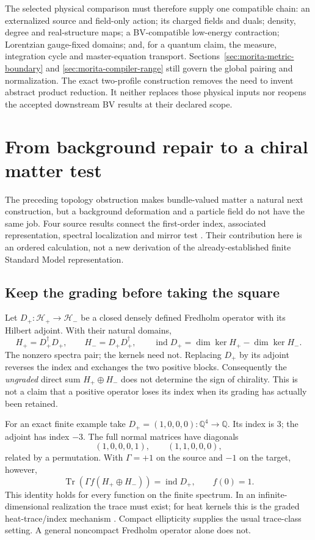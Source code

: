 \documentclass[11pt,a4paper]{article}
\begin{document}
The selected physical comparison must therefore supply one compatible
chain: an externalized source and field-only action; its charged fields
and duals; density, degree and real-structure maps; a BV-compatible
low-energy contraction; Lorentzian gauge-fixed domains; and, for a quantum
claim, the measure, integration cycle and master-equation transport.
Sections~\ref{sec:morita-metric-boundary} and
\ref{sec:morita-compiler-range} still govern the global pairing and
normalization. The exact two-profile construction removes the need to
invent abstract product reduction. It neither replaces those physical
inputs nor reopens the accepted downstream BV results at their declared
scope.

\section{From background repair to a chiral matter test}
\label{sec:matter-index-theta}

The preceding topology obstruction makes bundle-valued matter a natural
next construction, but a background deformation and a particle field do
not have the same job. Four source results connect the first-order index,
associated representation, spectral localization and mirror test
\cite{PreprojectionIndexFirst2026,PreprojectionMatterCompiler2026,
PreprojectionMatterTheta2026,PreprojectionBHTLocalization2026}.
Their contribution here is an ordered calculation, not a new derivation
of the already-established finite Standard Model representation.

\subsection{Keep the grading before taking the square}
\label{sec:matter-index-first}

Let \(D_+:\mathcal H_+\to\mathcal H_-\) be a closed densely defined
Fredholm operator with its Hilbert adjoint. With their natural domains,
\[
 H_+=D_+^\dagger D_+,\qquad H_-=D_+D_+^\dagger,\qquad
 \operatorname{ind}D_+=\dim\ker H_+-\dim\ker H_- .
\]
The nonzero spectra pair; the kernels need not. Replacing \(D_+\) by its
adjoint reverses the index and exchanges the two positive blocks.
Consequently the \emph{ungraded} direct sum \(H_+\oplus H_-\) does not
determine the sign of chirality. This is not a claim that a positive
operator loses its index when its grading has actually been retained.

For an exact finite example take \(D_+=(1,0,0,0):\mathbb Q^4\to\mathbb Q\).
Its index is \(3\); the adjoint has index \(-3\). The full normal matrices
have diagonals
\[
 (1,0,0,0,1),\qquad (1,1,0,0,0),
\]
related by a permutation. With \(\Gamma=+1\) on the source and \(-1\)
on the target, however,
\[
 \operatorname{Tr}\!\left(\Gamma f(H_+\oplus H_-)\right)
 =\operatorname{ind}D_+,\qquad f(0)=1.
\]
This identity holds for every function on the finite spectrum.
In an infinite-dimensional realization the trace must exist; for
heat kernels this is the graded heat-trace/index mechanism
\cite{McKeanSinger1967,BerlineGetzlerVergne2004}. Compact ellipticity
supplies the usual trace-class setting. A general noncompact Fredholm
operator alone does not.
\end{document}
